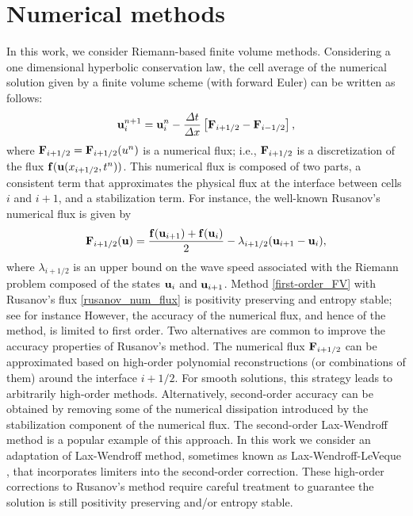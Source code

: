 \documentclass[preprint, 11pt]{article}
\newcommand{\bff}{{\bf f}}
\newcommand{\bfF}{{\bf F}}
\newcommand{\bfu}{{\bf u}}
\begin{document}
\section{Numerical methods}
In this work, we consider Riemann-based finite volume methods.
Considering a one dimensional hyperbolic conservation law,
the cell average of the numerical solution given by a
finite volume scheme (with forward Euler) can be written as follows:
\begin{align}\label{first-order_FV}
  \bfu_i^{n+1}=\bfu_i^n-\frac{\Delta t}{\Delta x}\left[\bfF_{i+1/2}-\bfF_{i-1/2}\right],
\end{align}
where $\bfF_{i+1/2}=\bfF_{i+1/2}(u^n)$ is a numerical flux; i.e., $\bfF_{i+1/2}$ is
a discretization of the flux $\bff(\bfu(x_{i+1/2},t^n))$.
This numerical flux is composed of two parts, a consistent term that approximates
the physical flux at the interface between cells $i$ and $i+1$, and a stabilization term.
For instance, the well-known Rusanov's numerical flux is given by
\begin{align}\label{rusanov_num_flux}
  \bfF_{i+1/2}(\bfu)=\frac{\bff(\bfu_{i+1})+\bff(\bfu_i)}{2} - \lambda_{i+1/2}(\bfu_{i+1}-\bfu_i),
\end{align}
where $\lambda_{i+1/2}$ is an upper bound on the wave speed associated with the Riemann problem
composed of the states $\bfu_i$ and $\bfu_{i+1}$.
Method \eqref{first-order_FV} with Rusanov's flux \eqref{rusanov_num_flux}
is positivity preserving and entropy stable; see for instance
\cite{perthame1996positivity,tadmor2003entropy,guermond2016invariant}
However, the accuracy of the numerical flux, and hence of the method, is
limited to first order.
Two alternatives are common to improve the accuracy properties of Rusanov's method.
The numerical flux $\bfF_{i+1/2}$ can be approximated based on high-order polynomial
reconstructions (or combinations of them) around the interface $i+1/2$.
For smooth solutions, this strategy leads to arbitrarily high-order
methods. Alternatively, second-order accuracy can be obtained by removing some of the
numerical dissipation introduced by the stabilization component of the numerical flux.
The second-order Lax-Wendroff method \cite{lax1959systems} is a popular example of this approach.
In this work we consider an adaptation of Lax-Wendroff method,
sometimes known as Lax-Wendroff-LeVeque \cite{leveque1997wave,leveque2002finite},
that incorporates limiters into the second-order correction.
These high-order corrections to Rusanov's method require careful treatment to guarantee
the solution is still positivity preserving and/or entropy stable.
\end{document}
